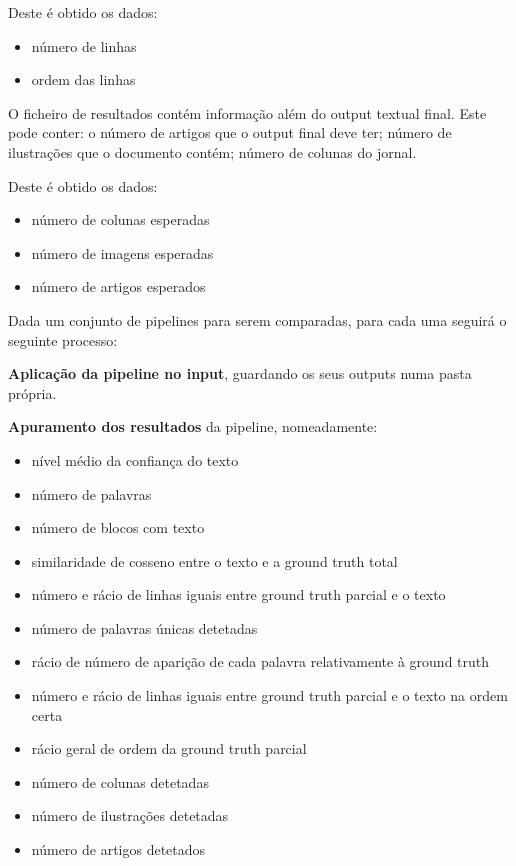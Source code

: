 Deste é obtido os dados: 

\begin{itemize}\setlength\itemsep{-0.8em}
	\item número de linhas
	\item ordem das linhas
\end{itemize}



O ficheiro de resultados contém informação além do output textual final. Este pode conter: o número de artigos que o output final deve ter; número de ilustrações que o documento contém; número de colunas do jornal.

Deste é obtido os dados: 

\begin{itemize}\setlength\itemsep{-0.8em}
	\item número de colunas esperadas
	\item número de imagens esperadas
	\item número de artigos esperados
\end{itemize}



Dada um conjunto de pipelines para serem comparadas, para cada uma seguirá o seguinte processo:

\textbf{Aplicação da pipeline no input}, guardando os seus outputs numa pasta própria.

\textbf{Apuramento dos resultados} da pipeline, nomeadamente: 

\begin{itemize}\setlength\itemsep{-0.8em}
	\item nível médio da confiança do texto
	\item número de palavras
	\item número de blocos com texto
	\item similaridade de cosseno entre o texto e a ground truth total
	\item número e rácio de linhas iguais entre ground truth parcial e o texto
	\item número de palavras únicas detetadas
	\item rácio de número de aparição de cada palavra relativamente à ground truth
	\item número e rácio de linhas iguais entre ground truth parcial e o texto na ordem certa
	\item rácio geral de ordem da ground truth parcial
	\item número de colunas detetadas
	\item número de ilustrações detetadas
	\item número de artigos detetados
\end{itemize}


